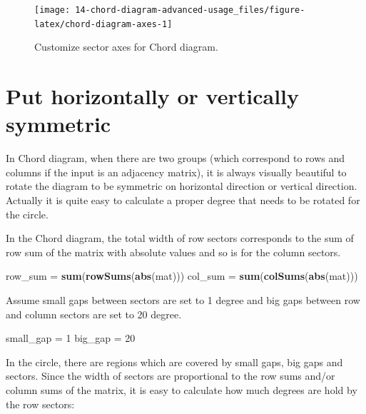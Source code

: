 \documentclass[]{book}
\newenvironment{Shaded}{\begin{snugshade}}{\end{snugshade}}
\newcommand{\KeywordTok}[1]{\textcolor[rgb]{0.13,0.29,0.53}{\textbf{#1}}}
\newcommand{\DecValTok}[1]{\textcolor[rgb]{0.00,0.00,0.81}{#1}}
\newcommand{\StringTok}[1]{\textcolor[rgb]{0.31,0.60,0.02}{#1}}
\newcommand{\NormalTok}[1]{#1}
\theoremstyle{definition}
\theoremstyle{definition}
\theoremstyle{remark}
\begin{document}
\begin{figure}

{\centering \texttt{[image: 14-chord-diagram-advanced-usage\_files/figure-latex/chord-diagram-axes-1]} 

}

\caption{Customize sector axes for Chord diagram.}\label{fig:chord-diagram-axes}
\end{figure}

\section{Put horizontally or vertically
symmetric}\label{put-horizontally-or-vertically-symmetric}

In Chord diagram, when there are two groups (which correspond to rows
and columns if the input is an adjacency matrix), it is always visually
beautiful to rotate the diagram to be symmetric on horizontal direction
or vertical direction. Actually it is quite easy to calculate a proper
degree that needs to be rotated for the circle.

In the Chord diagram, the total width of row sectors corresponds to the
sum of row sum of the matrix with absolute values and so is for the
column sectors.

\begin{Shaded}
\begin{Highlighting}[]
\NormalTok{row_sum =}\StringTok{ }\KeywordTok{sum}\NormalTok{(}\KeywordTok{rowSums}\NormalTok{(}\KeywordTok{abs}\NormalTok{(mat)))}
\NormalTok{col_sum =}\StringTok{ }\KeywordTok{sum}\NormalTok{(}\KeywordTok{colSums}\NormalTok{(}\KeywordTok{abs}\NormalTok{(mat)))}
\end{Highlighting}
\end{Shaded}

Assume small gaps between sectors are set to 1 degree and big gaps
between row and column sectors are set to 20 degree.

\begin{Shaded}
\begin{Highlighting}[]
\NormalTok{small_gap =}\StringTok{ }\DecValTok{1}
\NormalTok{big_gap =}\StringTok{ }\DecValTok{20}
\end{Highlighting}
\end{Shaded}

In the circle, there are regions which are covered by small gaps, big
gaps and sectors. Since the width of sectors are proportional to the row
sums and/or column sums of the matrix, it is easy to calculate how much
degrees are hold by the row sectors:
\end{document}
